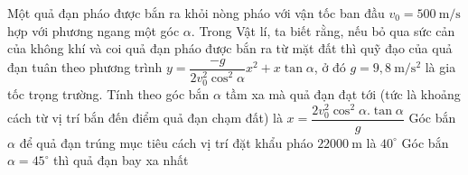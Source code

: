 \begin{ex}%
	Một quả đạn pháo được bắn ra khỏi nòng pháo với vận tốc ban đầu $v_0=500 ~\mathrm{m} / \mathrm{s}$ hợp với phương ngang một góc $\alpha$. Trong Vật lí, ta biết rằng, nếu bỏ qua sức cản của không khí và coi quả đạn pháo được bắn ra từ mặt đất thì quỹ đạo của quả đạn tuân theo phương trình $y=\dfrac{-g}{2 v_0^2 \cos ^2 \alpha} x^2+x \tan \alpha$, ở đó $g=9{,}8 \mathrm{~m} / \mathrm{s}^2$ là gia tốc trọng trường.
	{\True Tính theo góc bắn $\alpha$ tầm xa mà quả đạn đạt tới (tức là khoảng cách từ vị trí bắn đến điểm quả đạn chạm đất) là $x=\dfrac{2 v_0^2 \cos ^2 \alpha.\tan \alpha}{g}$}
	{Góc bắn $\alpha$ để quả đạn trúng mục tiêu cách vị trí đặt khẩu pháo $22000 \mathrm{~m}$ là $40^\circ$}
	{\True Góc bắn $\alpha=45^\circ$ thì quả đạn bay xa nhất}
\end{ex}
